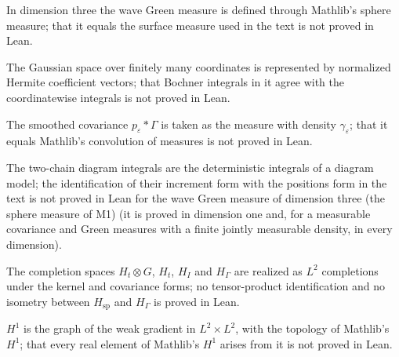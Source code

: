 \item[M1] In dimension three the wave Green measure is defined through Mathlib's sphere measure; that it equals the surface measure used in the text is not proved in Lean.
\item[M2] The Gaussian space over finitely many coordinates is represented by normalized Hermite coefficient vectors; that Bochner integrals in it agree with the coordinatewise integrals is not proved in Lean.
\item[M3] The smoothed covariance $p_\varepsilon*\Gamma$ is taken as the measure with density $\gamma_\varepsilon$; that it equals Mathlib's convolution of measures is not proved in Lean.
\item[M4] The two-chain diagram integrals are the deterministic integrals of a diagram model; the identification of their increment form with the positions form in the text is not proved in Lean for the wave Green measure of dimension three (the sphere measure of M1) (it is proved in dimension one and, for a measurable covariance and Green measures with a finite jointly measurable density, in every dimension).
\item[M5] The completion spaces $H_t\otimes G$, $H_t$, $H_I$ and $H_\Gamma$ are realized as $L^2$ completions under the kernel and covariance forms; no tensor-product identification and no isometry between $H_{\mathrm{sp}}$ and $H_\Gamma$ is proved in Lean.
\item[M6] $H^1$ is the graph of the weak gradient in $L^2\times L^2$, with the topology of Mathlib's $H^1$; that every real element of Mathlib's $H^1$ arises from it is not proved in Lean.
